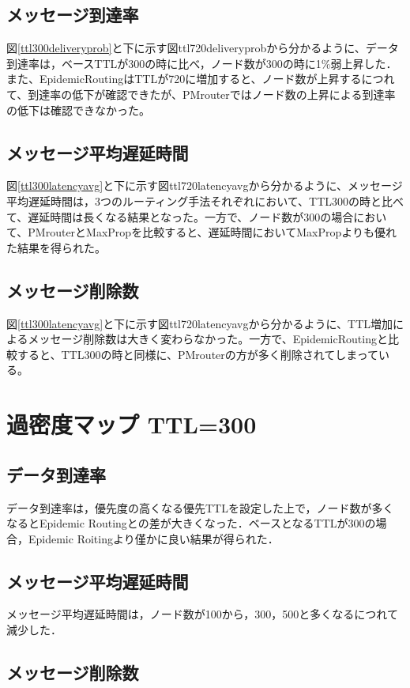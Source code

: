 \documentclass[11pt]{icsthesis}
\begin{document}
\subsection{メッセージ到達率}
図\ref{ttl300deliveryprob}と下に示す図{ttl720deliveryprob}から分かるように、データ到達率は，ベースTTLが300の時に比べ，ノード数が300の時に1\%弱上昇した．また、EpidemicRoutingはTTLが720に増加すると、ノード数が上昇するにつれて、到達率の低下が確認できたが、PMrouterではノード数の上昇による到達率の低下は確認できなかった。


\subsection{メッセージ平均遅延時間}
図\ref{ttl300latencyavg}と下に示す図{ttl720latencyavg}から分かるように、メッセージ平均遅延時間は，3つのルーティング手法それぞれにおいて、TTL300の時と比べて、遅延時間は長くなる結果となった。一方で、ノード数が300の場合において、PMrouterとMaxPropを比較すると、遅延時間においてMaxPropよりも優れた結果を得られた。


\subsection{メッセージ削除数}
図\ref{ttl300latencyavg}と下に示す図{ttl720latencyavg}から分かるように、TTL増加によるメッセージ削除数は大きく変わらなかった。一方で、EpidemicRoutingと比較すると、TTL300の時と同様に、PMrouterの方が多く削除されてしまっている。



\section{過密度マップ TTL=300}
\subsection{データ到達率}
データ到達率は，優先度の高くなる優先TTLを設定した上で，ノード数が多くなるとEpidemic Routingとの差が大きくなった．ベースとなるTTLが300の場合，Epidemic Roitingより僅かに良い結果が得られた．
\subsection{メッセージ平均遅延時間}
メッセージ平均遅延時間は，ノード数が100から，300，500と多くなるにつれて減少した．
\subsection{メッセージ削除数}
\end{document}
